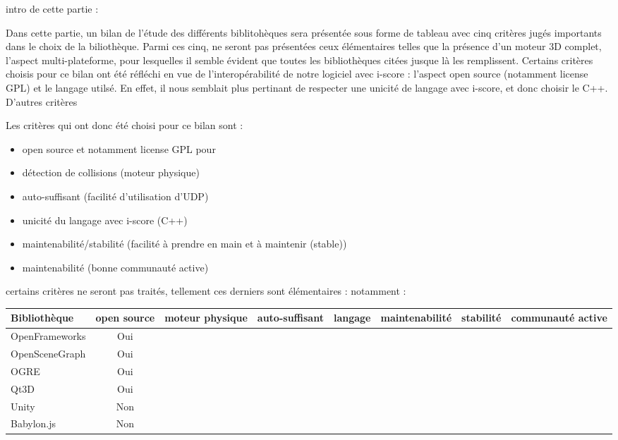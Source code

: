 intro de cette partie :

Dans cette partie, un bilan de l'étude des différents biblitohèques sera présentée sous forme de tableau avec cinq critères jugés importants dans le choix de la biliothèque. Parmi ces cinq, ne seront pas présentées ceux élémentaires telles que la présence d'un moteur 3D complet, l'aspect multi-plateforme, pour lesquelles il semble évident que toutes les bibliothèques citées jusque là les remplissent.
Certains critères choisis pour ce bilan ont été réfléchi en vue de l'interopérabilité de notre logiciel avec i-score : l'aspect open source (notamment license GPL) et le langage utilsé. En effet, il nous semblait plus pertinant de respecter une unicité de langage avec i-score, et donc choisir le C++. D'autres critères 

Les critères qui ont donc été choisi pour ce bilan sont : 
\begin{itemize}
\item open source et notamment license GPL pour 
\item détection de collisions (moteur physique)
\item auto-suffisant (facilité d'utilisation d'UDP)
\item unicité du langage avec i-score (C++)
\item maintenabilité/stabilité  (facilité à prendre en main et à maintenir (stable))
\item maintenabilité (bonne communauté active)
\end{itemize} 
certains critères ne seront pas traités, tellement ces derniers sont élémentaires :
notamment : 


\newpage
\begin{landscape}
\hspace{-2cm} 
\begin{tabular}{l|c|c|c|c|c|c|c}
Bibliothèque & open source & moteur physique & auto-suffisant & langage & maintenabilité & stabilité & communauté active\\
\hline
OpenFrameworks & Oui & & &  & & \\
OpenSceneGraph & Oui & & &  & & \\ 
OGRE & Oui & &  & & &\\
Qt3D & Oui & &  & & &\\
Unity & Non &  & & & &\\
Babylon.js  & Non & & & & & \\
\end{tabular}
\end{landscape}
